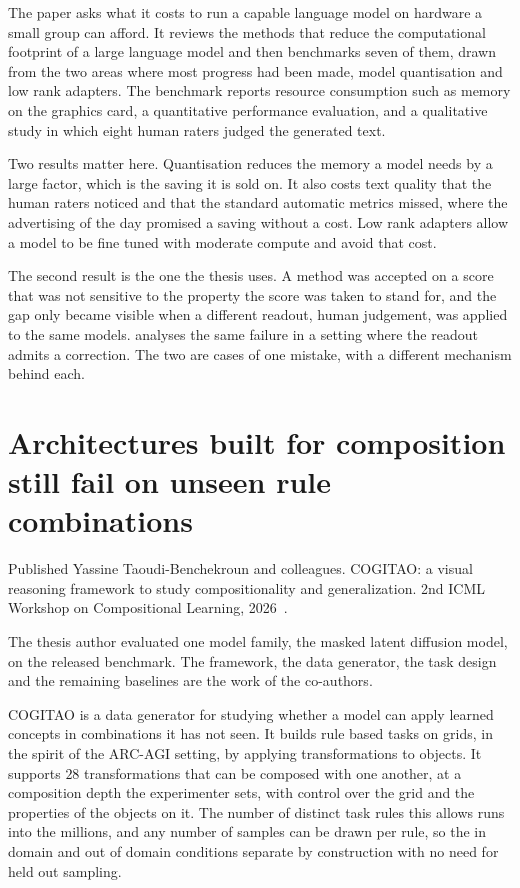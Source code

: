 The paper asks what it costs to run a capable language model on hardware a
small group can afford. It reviews the methods that reduce the computational
footprint of a large language model and then benchmarks seven of them, drawn
from the two areas where most progress had been made, model quantisation and
low rank adapters. The benchmark reports resource consumption such as memory
on the graphics card, a quantitative performance evaluation, and a qualitative
study in which eight human raters judged the generated text.

Two results matter here. Quantisation reduces the memory a model needs by a
large factor, which is the saving it is sold on. It also costs text quality
that the human raters noticed and that the standard automatic metrics missed,
where the advertising of the day promised a saving without a cost. Low rank
adapters allow a model to be fine tuned with moderate compute and avoid that
cost.

The second result is the one the thesis uses. A method was accepted on a score
that was not sensitive to the property the score was taken to stand for, and
the gap only became visible when a different readout, human judgement, was
applied to the same models.  analyses the same failure in
a setting where the readout admits a correction. The two are cases of one
mistake, with a different mechanism behind each.

\section{Architectures built for composition still fail on unseen rule combinations}
\label{sec:cogitao}

\begin{publicationbasis}{Published}
Yassine Taoudi-Benchekroun and colleagues. COGITAO: a visual reasoning
framework to study compositionality and generalization. 2nd ICML Workshop on
Compositional Learning, 2026~\cite{taoudibenchekroun_cogitao_2026}.
\end{publicationbasis}

The thesis author evaluated one model family, the masked latent diffusion
model, on the released benchmark. The framework, the data generator, the task
design and the remaining baselines are the work of the co-authors.

COGITAO is a data generator for studying whether a model can apply learned
concepts in combinations it has not seen. It builds rule based tasks on grids,
in the spirit of the ARC-AGI setting, by applying transformations to objects.
It supports $28$ transformations that can be composed with one another, at a
composition depth the experimenter sets, with control over the grid and the
properties of the objects on it. The number of distinct task rules this allows
runs into the millions, and any number of samples can be drawn per rule, so
the in domain and out of domain conditions separate by construction with no
need for held out sampling.

